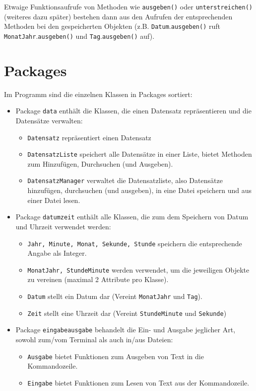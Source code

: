 \documentclass[oneside,12pt]{scrartcl}
\newcommand{\class}[1]{\textcolor{Green4}{\bcode{#1}}}
\newcommand{\package}[1]{Package \textcolor{Blue4}{\bcode{#1}}}
\newcommand{\method}[1]{\textcolor{Orange3}{\bcode{#1()}}}
\newcommand{\methodcall}[2]{\class{#1}.\method{#2}}
\newcommand{\bcode}[1]{\texttt{#1}}
\begin{document}
Etwaige Funktionsaufrufe von Methoden wie \method{ausgeben} oder \method{unterstreichen} (weiteres dazu später) bestehen dann aus den Aufrufen der entsprechenden Methoden bei den gespeicherten Objekten (z.B. \methodcall{Datum}{ausgeben} ruft \methodcall{MonatJahr}{ausgeben} und \methodcall{Tag}{ausgeben} auf).

\section{Packages}
Im Programm sind die einzelnen Klassen in Packages sortiert:
\begin{itemize}
\item \package{data} enthält die Klassen, die einen Datensatz repräsentieren und die Datensätze verwalten:
\begin{itemize}
\item \class{Datensatz} repräsentiert einen Datensatz
\item \class{DatensatzListe} speichert alle Datensätze in einer Liste, bietet Methoden zum Hinzufügen, Durchsuchen (und Ausgeben).
\item \class{DatensatzManager} verwaltet die Datensatzliste, also Datensätze hinzufügen, durchsuchen (und ausgeben), in eine Datei speichern und aus einer Datei lesen.
\end{itemize}
\item \package{datumzeit} enthält alle Klassen, die zum dem Speichern von Datum und Uhrzeit verwendet werden:
\begin{itemize}
\item \class {Jahr, Minute, Monat, Sekunde, Stunde} speichern die entsprechende Angabe als Integer.
\item \class {MonatJahr, StundeMinute} werden verwendet, um die jeweiligen Objekte zu vereinen (maximal 2 Attribute pro Klasse).
\item \class {Datum} stellt ein Datum dar (Vereint \class{MonatJahr} und \class{Tag}).
\item \class {Zeit} stellt eine Uhrzeit dar (Vereint \class{StundeMinute} und \class{Sekunde})
\end{itemize}
\item \package{eingabeausgabe} behandelt die Ein- und Ausgabe jeglicher Art, sowohl zum/vom Terminal als auch in/aus Dateien:
\begin{itemize}
\item \class{Ausgabe} bietet Funktionen zum Ausgeben von Text in die Kommandozeile.
\item \class{Eingabe} bietet Funktionen zum Lesen von Text aus der Kommandozeile.

\end{itemize}
\end{itemize}
\end{document}

